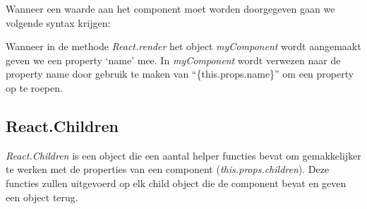 		Wanneer een waarde aan het component moet worden doorgegeven gaan we volgende syntax krijgen:
		
		
		Wanneer in de methode \emph{React.render} het object \emph{myComponent} wordt aangemaakt geven we een property `name' mee. In \emph{myComponent} wordt verwezen naar de property name door gebruik te maken van ``\{this.props.name\}'' om een property op te roepen.
	
	\subsection{React.Children}
		
		\emph{React.Children} is een object die een aantal helper functies bevat om gemakkelijker te werken met de properties van een component (\emph{this.props.children}). Deze functies zullen uitgevoerd op elk child object die de component bevat en geven een object terug.
		

